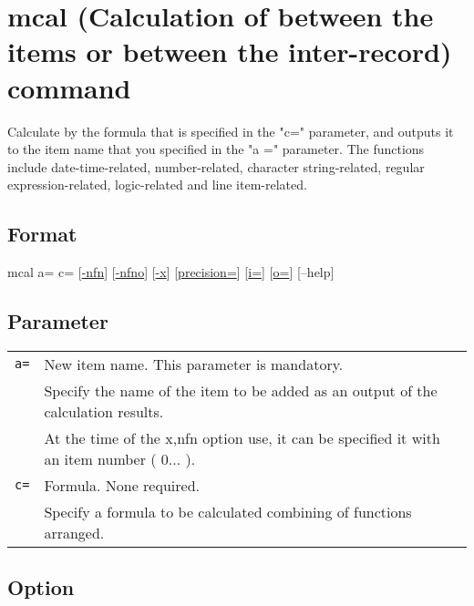 \documentclass[fleqn,a4paper]{jarticle}
\begin{document}
\setlength{\baselineskip}{4mm}

\section*{mcal (Calculation of between the items or between the inter-record) command}
Calculate by the formula that is specified in the "c=" parameter, and outputs it to the item name that you specified in the "a =" parameter. The functions include date-time-related, number-related, character string-related, regular expression-related, logic-related and line item-related.

\subsection*{Format}
mcal a= c= [\href{run:option.pdf}{-nfn}] [\href{run:option.pdf}{-nfno}]  [\href{run:option.pdf}{-x}] [\href{run:option.pdf}{precision=}] [\href{run:option.pdf}{i=}] [\href{run:option.pdf}{o=}] [--help]\\

\subsection*{Parameter}
\begin{table}[htbp]
{\small
\begin{tabular}{ll}
\verb|a=|    & New item name. This parameter is mandatory.\\
& Specify the name of the item to be added as an output of the calculation results.\\
& At the time of the x,nfn option use, it can be specified it with an item number ( 0... ). \\
\verb|c=|    & Formula. None required.\\
& Specify a formula to be calculated combining of functions arranged.\\
\end{tabular} 
}
\end{table} 

\subsection*{Option}
\begin{table}[htbp]
{\small
\begin{tabular}{ll}

\end{tabular} 
}
\end{table} 
\end{document}
